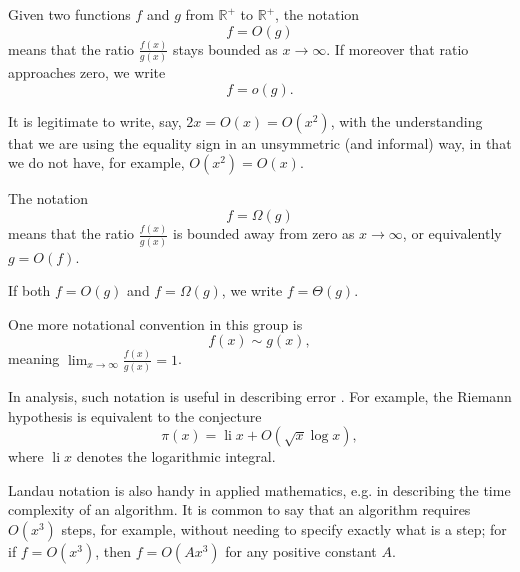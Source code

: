 \documentclass[12pt]{article}
\begin{document}
Given two functions $f$ and $g$ from $\mathbb{R}^+$ to $\mathbb{R}^+$,
the notation
$$f=O(g)$$
means that the ratio $\displaystyle \frac{f(x)}{g(x)}$
stays bounded as $x\to\infty$. If moreover that ratio approaches zero,
we write
$$f=o(g).$$

It is legitimate to write, say, $2x=O(x)=O(x^2)$, with the understanding
that we are using the equality sign in an unsymmetric (and informal) way,
in that we do not have, for example, $O(x^2)=O(x)$.

The notation
$$f=\Omega(g)$$
means that the ratio $\displaystyle \frac{f(x)}{g(x)}$
is bounded away from zero as $x\to\infty$, or equivalently $g=O(f)$.

If both $f=O(g)$ and $f=\Omega(g)$, we write $f=\Theta(g)$.

One more notational convention in this group is $$f(x)\sim g(x),$$
meaning $\displaystyle \lim_{x\to\infty}\frac{f(x)}{g(x)}=1$.

In analysis, such notation is useful in describing error .
For example, the Riemann hypothesis is equivalent to the conjecture
$$\pi(x)=\operatorname{li} x+O(\sqrt{x}\log x),$$ where $\operatorname{li} x$ denotes the logarithmic integral.

Landau notation is also handy in applied mathematics, e.g. in describing
the time complexity of an algorithm. It is common to say that an algorithm
requires $O(x^3)$ steps, for example, without needing to specify exactly what
is a step; for if $f=O(x^3)$, then $f=O(Ax^3)$ for any positive constant
$A$.
\end{document}
